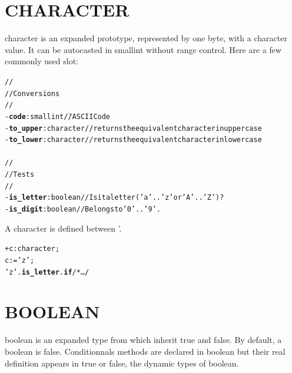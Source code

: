 \documentclass[11pt]{mybook}
\begin{document}
\section{CHARACTER}
\label{library:character}
%
{\sc{}character} is an expanded prototype, represented by one byte, with a character value. It can be autocasted in smallint without range control.
Here are a few commonly used slot:
\begin{alltt}
\begin{tabbing}
  //\\
  // Conversions\\
  //\\
  - {\bf{}code}:{\sc{}smallint}        \= // ASCII Code\\
  - {\bf{}to\_upper}:{\sc{}character}  \> // returns the equivalent character in upper case\\
  - {\bf{}to\_lower}:{\sc{}character}  \> // returns the equivalent character in lower case\\
\\
  //\\
  // Tests\\
  //\\
  - {\bf{}is\_letter}:{\sc{}boolean}   \> // Is it a letter ('a' .. 'z' or 'A' .. 'Z') ?\\
  - {\bf{}is\_digit}:{\sc{}boolean}    \> // Belongs to '0'..'9'.\\
\end{tabbing}
\end{alltt}
A character is defined between '.
\begin{alltt}
   + c:{\sc{}character};
   c := 'z';
   'z'.{\bf{}is\_letter}.{\bf{}if} /* \ldots */
\end{alltt}

\section{BOOLEAN}
\label{library:boolean}
%
{\sc{}boolean} is an expanded type from which inherit {\sc{}true} and {\sc{}false}.
By default, a {\sc{}boolean} is {\sc{}false}.
Conditionnals methods are declared in {\sc{}boolean} but their real definition appears in {\sc{}true} or {\sc{}false}, the dynamic types of {\sc{}boolean}.
\end{document}
